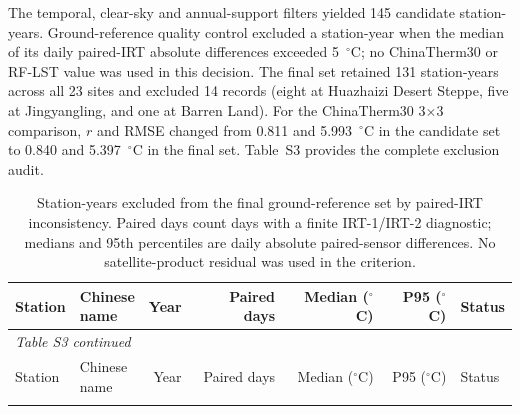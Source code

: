 \documentclass[11pt,a4paper]{article}
\begin{document}
The temporal, clear-sky and annual-support filters yielded 145 candidate station-years. Ground-reference quality control excluded a station-year when the median of its daily paired-IRT absolute differences exceeded 5~$^{\circ}$C; no ChinaTherm30 or RF-LST value was used in this decision. The final set retained 131 station-years across all 23 sites and excluded 14 records (eight at Huazhaizi Desert Steppe, five at Jingyangling, and one at Barren Land). For the ChinaTherm30 3$\times$3 comparison, $r$ and RMSE changed from 0.811 and 5.993~$^{\circ}$C in the candidate set to 0.840 and 5.397~$^{\circ}$C in the final set. Table~S3 provides the complete exclusion audit.

\begin{longtable}{@{}p{2.7cm}p{1.5cm}r r r r p{2.3cm}@{}}
\caption{Station-years excluded from the final ground-reference set by paired-IRT inconsistency. Paired days count days with a finite IRT-1/IRT-2 diagnostic; medians and 95th percentiles are daily absolute paired-sensor differences. No satellite-product residual was used in the criterion.}\label{tab:s3-ground-qc}\\
\toprule
Station & \shortstack{Chinese\\name} & Year & Paired days & Median ($^{\circ}$C) & P95 ($^{\circ}$C) & Status \\
\midrule
\endfirsthead
\multicolumn{7}{l}{\textit{Table S3 continued}}\\
\toprule
Station & \shortstack{Chinese\\name} & Year & Paired days & Median ($^{\circ}$C) & P95 ($^{\circ}$C) & Status \\
\midrule
\endhead
\bottomrule
\endfoot

\end{longtable}

\clearpage
\label{sec:si-interannual}

\clearpage
\label{sec:si-references}
\printbibliography
\end{document}
